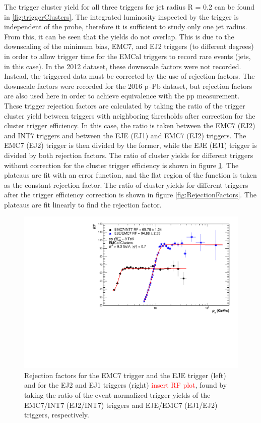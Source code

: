 \documentclass[ALICE]{ALICE_analysis_notes}
\newcommand{\pPb}{{\mbox{p--Pb}}\xspace}
\newcommand{\pp}{pp\xspace}
\begin{document}
The trigger cluster yield for all three triggers for jet radius R = 0.2 can be found in \ref{fig:triggerClusters}. The integrated luminosity inspected by the trigger is independent of the probe, therefore it is sufficient to study only one jet radius. From this, it can be seen that the yields do not overlap. This is due to the downscaling of the minimum bias, EMC7, and EJ2 triggers (to different degrees) in order to allow trigger time for the EMCal triggers to record rare events (jets, in this case). In the 2012 dataset, these downscale factors were not recorded. Instead, the triggered data must be corrected by the use of rejection factors. The downscale factors were recorded for the 2016 \pPb dataset, but rejection factors are also used here in order to achieve equivalence with the \pp measurement. These trigger rejection factors are calculated by taking the ratio of the trigger cluster yield between triggers with neighboring thresholds after correction for the cluster trigger efficiency. In this case, the ratio is taken between the EMC7 (EJ2) and INT7 triggers and between the EJE (EJ1) and EMC7 (EJ2) triggers. The EMC7 (EJ2) trigger is then divided by the former, while the EJE (EJ1) trigger is divided by both rejection factors. The ratio of cluster yields for different triggers without correction for the cluster trigger efficiency is shown in figure \ref{fig:RejectionFactorsUnscaled}. The plateaus are fit with an error function, and the flat region of the function is taken as the constant rejection factor. The ratio of cluster yields for different triggers after the trigger efficiency correction is shown in figure \ref{fig:RejectionFactors}. The plateaus are fit linearly to find the rejection factor.

\begin{figure}
    \centering
    \includegraphics[width=15cm]{figures/RejectionFactors/RF_R02_Unscaled.pdf}
    \caption{Rejection factors for the EMC7 trigger and the EJE trigger (left) and for the EJ2 and EJ1 triggers (right) \textcolor{red}{insert RF plot}, found by taking the ratio of the event-normalized trigger yields of the EMC7/INT7 (EJ2/INT7) triggers and EJE/EMC7 (EJ1/EJ2) triggers, respectively.}
    \label{fig:RejectionFactorsUnscaled}
\end{figure}
\end{document}
